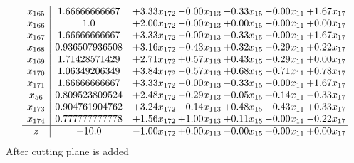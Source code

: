 \documentclass[8pt]{article}
\begin{document}
\[\begin{array}{c| c c@{\hskip 2pt} c@{\hskip 2pt} c@{\hskip 2pt} c@{\hskip 2pt} c@{\hskip 2pt} }
 x_{165}   &  1.66666666667 & +  3.33 x_{172} & -0.00 x_{113} & -0.33 x_{15} & -0.00 x_{11} & +  1.67 x_{17}\\
 x_{166}   &  1.0 & +  2.00 x_{172} & -0.00 x_{113} & +  0.00 x_{15} & -0.00 x_{11} & +  0.00 x_{17}\\
 x_{167}   &  1.66666666667 & +  3.33 x_{172} & -0.00 x_{113} & -0.33 x_{15} & -0.00 x_{11} & +  1.67 x_{17}\\
 x_{168}   &  0.936507936508 & +  3.16 x_{172} & -0.43 x_{113} & +  0.32 x_{15} & -0.29 x_{11} & +  0.22 x_{17}\\
 x_{169}   &  1.71428571429 & +  2.71 x_{172} & +  0.57 x_{113} & +  0.43 x_{15} & -0.29 x_{11} & +  0.00 x_{17}\\
 x_{170}   &  1.06349206349 & +  3.84 x_{172} & -0.57 x_{113} & +  0.68 x_{15} & -0.71 x_{11} & +  0.78 x_{17}\\
 x_{171}   &  1.66666666667 & +  3.33 x_{172} & -0.00 x_{113} & -0.33 x_{15} & -0.00 x_{11} & +  1.67 x_{17}\\
 x_{56}   &  0.809523809524 & +  2.48 x_{172} & -0.29 x_{113} & -0.05 x_{15} & +  0.14 x_{11} & -0.33 x_{17}\\
 x_{173}   &  0.904761904762 & +  3.24 x_{172} & -0.14 x_{113} & +  0.48 x_{15} & -0.43 x_{11} & +  0.33 x_{17}\\
 x_{174}   &  0.777777777778 & +  1.56 x_{172} & +  1.00 x_{113} & +  0.11 x_{15} & -0.00 x_{11} & -0.22 x_{17}\\
\hline
z    &  -10.0 & -1.00 x_{172} & +  0.00 x_{113} & -0.00 x_{15} & +  0.00 x_{11} & +  0.00 x_{17}\\
\end{array}\]
 After cutting plane is added 
\end{document}
